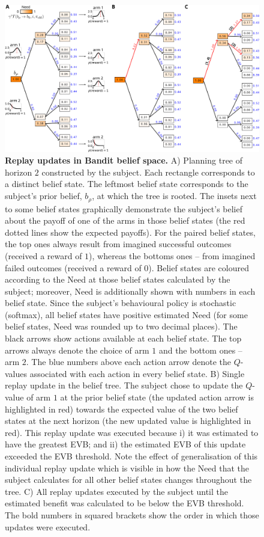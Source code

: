 \begin{figure}[h!]
    \centering
    \includegraphics[width=1\textwidth]{Figures/supp/supp1.png}
    \caption{\textbf{Replay updates in Bandit belief space.} A) Planning tree of horizon $2$ constructed by the subject. Each rectangle corresponds to a distinct belief state. The leftmost belief state corresponds to the subject's prior belief, $b_\rho$, at which the tree is rooted. The insets next to some belief states graphically demonstrate the subject's belief about the payoff of one of the arms in those belief states (the red dotted lines show the expected payoffs). For the paired belief states, the top ones always result from imagined successful outcomes (received a reward of $1$), whereas the bottoms ones -- from imagined failed outcomes (received a reward of $0$). Belief states are coloured according to the Need at those belief states calculated by the subject; moreover, Need is additionally shown with numbers in each belief state. Since the subject's behavioural policy is stochastic (softmax), all belief states have positive estimated Need (for some belief states, Need was rounded up to two decimal places). The black arrows show actions available at each belief state. The top arrows always denote the choice of arm $1$ and the bottom ones -- arm $2$. The blue numbers above each action arrow denote the $Q$-values associated with each action in every belief state. B) Single replay update in the belief tree. The subject chose to update the $Q$-value of arm $1$ at the prior belief state (the updated action arrow is highlighted in red) towards the expected value of the two belief states at the next horizon (the new updated value is highlighted in red). This replay update was executed because i) it was estimated to have the greatest EVB; and ii) the estimated EVB of this update exceeded the EVB threshold. Note the effect of generalisation of this individual replay update which is visible in how the Need that the subject calculates for all other belief states changes throughout the tree. C) All replay updates executed by the subject until the estimated benefit was calculated to be below the EVB threshold. The bold numbers in squared brackets show the order in which those updates were executed.}
    \label{fig:supp1}
\end{figure}

